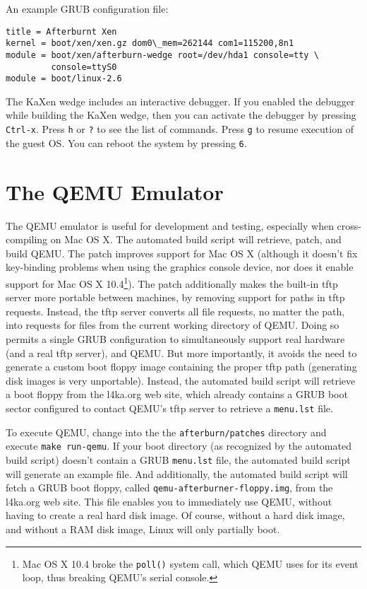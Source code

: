 \documentclass[twoside,a4paper]{report}
\newcommand{\code}[1]{{\tt #1}}
\newcommand{\cmd}[1]{\code{#1}}
\begin{document}
An example GRUB configuration file:
\begin{verbatim}
title = Afterburnt Xen
kernel = boot/xen/xen.gz dom0\_mem=262144 com1=115200,8n1
module = boot/xen/afterburn-wedge root=/dev/hda1 console=tty \
         console=ttyS0
module = boot/linux-2.6
\end{verbatim}

The KaXen wedge includes an interactive debugger.  If you enabled the
debugger while building the KaXen wedge, then you can activate the
debugger by pressing \cmd{Ctrl-x}.  Press \cmd{h} or \cmd{?} to see
the list of commands.  Press \cmd{g} to resume execution of the guest
OS.  You can reboot the system by pressing \cmd{6}.


\section{The QEMU Emulator}

The QEMU emulator is useful for development and testing, especially
when cross-compiling on Mac OS X.  The automated build script will retrieve,
patch, and build QEMU.  The patch improves support for Mac OS X
(although it doesn't fix key-binding problems when using the graphics
console device, nor does it enable support for Mac OS X
10.4\footnote{Mac OS X 10.4 broke the \code{poll()} system call, which QEMU
uses for its event loop, thus breaking QEMU's serial console.}).  The
patch additionally makes the built-in tftp server more portable
between machines, by removing support for paths in tftp requests.
Instead, the tftp server converts all file requests, no matter the
path, into requests for files from the current working directory of
QEMU.  Doing so permits a single GRUB configuration to simultaneously
support real hardware (and a real tftp server), and QEMU.  But more
importantly, it avoids the need to generate a custom boot floppy image
containing the proper tftp path (generating disk images is very
unportable).  Instead, the automated build script will retrieve a boot
floppy from the l4ka.org web site, which already contains a GRUB boot
sector configured to contact QEMU's tftp server to retrieve a
\code{menu.lst} file.

To execute QEMU, change into the
the \code{afterburn/patches} directory and execute 
\cmd{make run-qemu}.  If your boot directory (as recognized by the
automated build script) doesn't contain a GRUB \code{menu.lst} file,
the automated build script will generate an example file.  And
additionally, the automated build script will fetch a GRUB boot
floppy, called \code{qemu-afterburner-floppy.img}, from the l4ka.org
web site.  This file enables you to immediately use QEMU, without
having to create a real hard disk image.  Of course, without a hard
disk image, and without a RAM disk image, Linux will only partially
boot.
\end{document}
